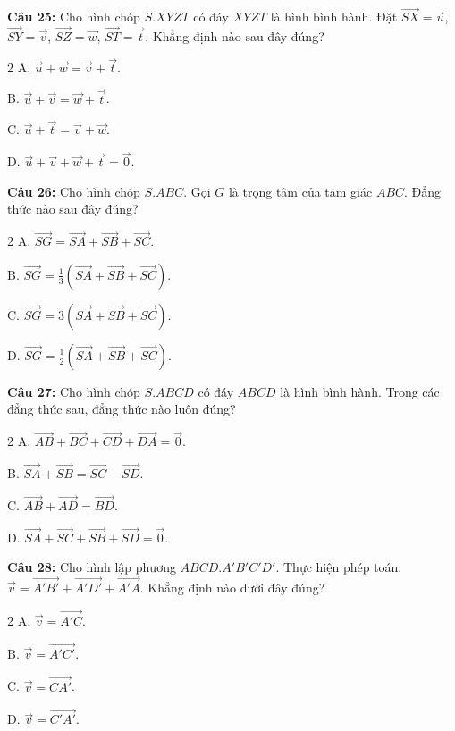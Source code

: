 \documentclass[12pt]{article}
\begin{document}
	\noindent \textbf{Câu 25:} Cho hình chóp $S.XYZT$ có đáy $XYZT$ là hình bình hành. Đặt $\overrightarrow{SX} = \vec{u}$, $\overrightarrow{SY} = \vec{v}$, $\overrightarrow{SZ} = \vec{w}$, $\overrightarrow{ST} = \vec{t}$. Khẳng định nào sau đây đúng?
	\begin{multicols}{2}
		A. $\vec{u} + \vec{w} = \vec{v} + \vec{t}$. \par
		B. $\vec{u} + \vec{v} = \vec{w} + \vec{t}$. \par
		C. $\vec{u} + \vec{t} = \vec{v} + \vec{w}$. \par
		D. $\vec{u} + \vec{v} + \vec{w} + \vec{t} = \vec{0}$.
	\end{multicols}
	
	\vspace{0.2cm}
	\noindent \textbf{Câu 26:} Cho hình chóp $S.ABC$. Gọi $G$ là trọng tâm của tam giác $ABC$. Đẳng thức nào sau đây đúng?
	\begin{multicols}{2}
		A. $\overrightarrow{SG} = \overrightarrow{SA} + \overrightarrow{SB} + \overrightarrow{SC}$. \par
		B. $\overrightarrow{SG} = \frac{1}{3}(\overrightarrow{SA} + \overrightarrow{SB} + \overrightarrow{SC})$. \par
		C. $\overrightarrow{SG} = 3(\overrightarrow{SA} + \overrightarrow{SB} + \overrightarrow{SC})$. \par
		D. $\overrightarrow{SG} = \frac{1}{2}(\overrightarrow{SA} + \overrightarrow{SB} + \overrightarrow{SC})$.
	\end{multicols}
	
	\vspace{0.2cm}
	\noindent \textbf{Câu 27:} Cho hình chóp $S.ABCD$ có đáy $ABCD$ là hình bình hành. Trong các đẳng thức sau, đẳng thức nào luôn đúng?
	\begin{multicols}{2}
		A. $\overrightarrow{AB} + \overrightarrow{BC} + \overrightarrow{CD} + \overrightarrow{DA} = \vec{0}$. \par
		B. $\overrightarrow{SA} + \overrightarrow{SB} = \overrightarrow{SC} + \overrightarrow{SD}$. \par
		C. $\overrightarrow{AB} + \overrightarrow{AD} = \overrightarrow{BD}$. \par
		D. $\overrightarrow{SA} + \overrightarrow{SC} + \overrightarrow{SB} + \overrightarrow{SD} = \vec{0}$.
	\end{multicols}
	
	\vspace{0.2cm}
	\noindent \textbf{Câu 28:} Cho hình lập phương $ABCD.A'B'C'D'$. Thực hiện phép toán: $\vec{v} = \overrightarrow{A'B'} + \overrightarrow{A'D'} + \overrightarrow{A'A}$. Khẳng định nào dưới đây đúng?
	\begin{multicols}{2}
		A. $\vec{v} = \overrightarrow{A'C}$. \par
		B. $\vec{v} = \overrightarrow{A'C'}$. \par
		C. $\vec{v} = \overrightarrow{CA'}$. \par
		D. $\vec{v} = \overrightarrow{C'A'}$.
	\end{multicols}
	
\end{document}
